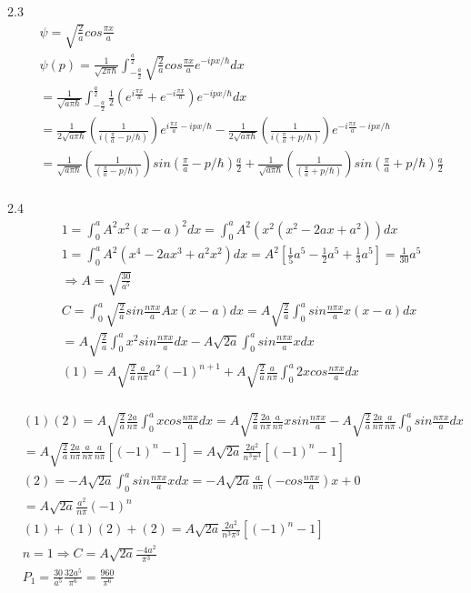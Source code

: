 \documentclass{article}
\begin{document}
  2.3
  \begin{align*}
    & \psi=\sqrt{\frac2a}cos\frac{\pi x}a\\
    & \psi(p)=\frac1{\sqrt{2\pi\hbar}}\int^{\frac a2}_{ -\frac a2} \sqrt{\frac2a}cos\frac{\pi x}a e^{-ipx/\hbar}dx \\
    &=\frac1{\sqrt{a\pi\hbar}}\int^{\frac a2}_{-\frac a2}\frac12(e^{i\frac{\pi x}a}+e^{-i\frac{ \pi x}a})e^{-ipx/\hbar}dx \\
    &=\frac1{2\sqrt{a\pi \hbar}}(\frac1{i(\frac{\pi}a-p/\hbar)})e^{i\frac{\pi x}a-ipx/\hbar}-\frac1{2\sqrt{a\pi \hbar}}(\frac1{i(\frac{\pi}a+p/\hbar)})e^{-i\frac{\pi x}a-ipx/\hbar} \\
    &=\frac1{\sqrt{a\pi\hbar}}(\frac1{(\frac{\pi}a-p/\hbar)})sin(\frac{\pi}a-p/\hbar)\frac a2+\frac1{\sqrt{a\pi\hbar}}(\frac1{(\frac{\pi}a+p/\hbar)})sin(\frac{\pi}a+p/\hbar)\frac a2 \\
  \end{align*}

  2.4\begin{align*}
    &1=\int^a_0 A^2x^2(x-a)^2dx=\int^a_0 A^2(x^2(x^2-2ax+a^2))dx\\
    &1=\int^a_0 A^2(x^4-2ax^3+a^2x^2)dx=A^2[\frac15 a^5-\frac12a^5+\frac13a^5]=\frac1{30}a^5 \\
    &\Rightarrow A=\sqrt{\frac{30}{a^5}} \\
    &C=\int^a_0\sqrt{\frac2a}sin\frac{n\pi x}aAx(x-a)dx=A\sqrt{\frac2a}\int^a_0 sin\frac{n\pi x}a x(x-a)dx \\
    &=A\sqrt{\frac2a}\int^a_0 x^2 sin\frac{n\pi x}adx-A\sqrt{2a}\int^a_0 sin\frac{ n \pi x}a xdx \\
    &(1)=A\sqrt{\frac2a}\frac{a}{n\pi}a^2 (-1)^{n+1}+A\sqrt{\frac2a}\frac{a}{n\pi}\int^a_0 2x cos\frac{n\pi x}a dx  \\
  \end{align*}

  \begin{align*}
    &(1)(2)=A\sqrt{\frac2a}\frac{2a}{n\pi}\int^a_0 x cos\frac{n\pi x}a dx =A\sqrt{\frac2a}\frac{2a}{n\pi}\frac{a}{n\pi} xsin\frac{n\pi x}a-A\sqrt{\frac2a}\frac{2a}{n\pi}\frac{a}{n\pi} \int^a_0sin\frac{n\pi x}adx  \\
    & = A\sqrt{\frac2a}\frac{2a}{n\pi}\frac{a}{n\pi}\frac{a}{n\pi}[(-1)^n-1]=A\sqrt{2a}\frac{2a^2}{n^3\pi^3}[(-1)^n-1]\\
    &(2)=-A\sqrt{2a}\int^a_0 sin\frac{n\pi x}axdx=-A\sqrt{2a}\frac{a}{n\pi}(-cos\frac{n\pi x}a)x+0\\
    &=A\sqrt{2a}\frac{a^2}{n\pi}(-1)^n \\
    &(1)+(1)(2)+(2)= A\sqrt{2a}\frac{2a^2}{n^3\pi^3}[(-1)^n-1]\\
    &n=1\Rightarrow C=A\sqrt{2a}\frac{-4a^2}{\pi^3} \\
    &P_1=\frac{30}{a^5}\frac{32a^5}{\pi^6}=\frac{960}{\pi^6} \\
  \end{align*}
\end{document}
